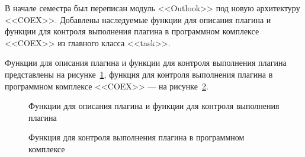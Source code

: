 В начале семестра был переписан модуль <<Outlook>> под новую архитектуру <<COEX>>.
Добавлены наследуемые функции для описания плагина и функции для контроля выполнения плагина в программном комплексе <<COEX>> из главного класса <<task>>.

Функции для описания плагина и функции для контроля выполнения плагина представлены на рисунке~\ref{Outlook:Outlook}, функция для контроля выполнения плагина в программном комплексе <<COEX>> --- на рисунке~\ref{Outlook2:Outlook2}.

\begin{figure}[h!]
\caption{ Функции для описания плагина и функции для контроля выполнения плагина }
\label{Outlook:Outlook}
\end{figure}

\begin{figure}[h!]
\caption{ Функция для контроля выполнения плагина в программном комплексе }
\label{Outlook2:Outlook2}
\end{figure}



